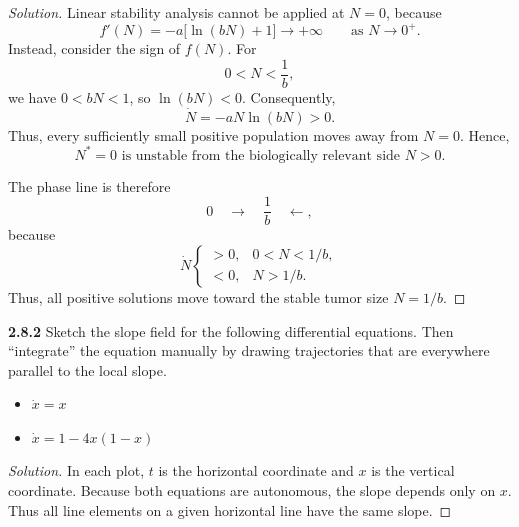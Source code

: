 \documentclass[10pt]{amsart}
\newenvironment{solution}
{\begin{proof}[Solution]}
{\end{proof}}
\begin{document}
\begin{onehalfspace}
\begin{solution}
            Linear stability analysis cannot be applied at \(N=0\), because
            \[
                f'(N)=-a\bigl[\ln(bN)+1\bigr]\longrightarrow+\infty
                \qquad\text{as }N\to0^+.
            \]
            Instead, consider the sign of \(f(N)\). For
            \[
                0<N<\frac{1}{b},
            \]
            we have \(0<bN<1\), so \(\ln(bN)<0\). Consequently,
            \[
                \dot{N}=-aN\ln(bN)>0.
            \]
            Thus, every sufficiently small positive population moves away from
            \(N=0\). Hence,
            \[
                \boxed{N^*=0\text{ is unstable from the biologically relevant side }
                N>0.}
            \]

            The phase line is therefore
            \[
                0\quad\longrightarrow\quad \frac{1}{b}
                \quad\longleftarrow,
            \]
            because
            \[
                \dot{N}
                \begin{cases}
                    >0, & 0<N<1/b,\\
                    <0, & N>1/b.
                \end{cases}
            \]
            Thus, all positive solutions move toward the stable tumor size
            \(N=1/b\).

        \end{solution}

        \noindent\textbf{2.8.2} Sketch the slope field for the following differential equations.
        Then ``integrate'' the equation manually by drawing trajectories that are everywhere
        parallel to the local slope.
        \begin{itemize}
            \item[(a)] $\dot{x} = x$
            \item[(c)] $\dot{x} = 1 - 4x(1 - x)$
        \end{itemize}

        \begin{solution}
            In each plot, $t$ is the horizontal coordinate and $x$ is the vertical
            coordinate. Because both equations are autonomous, the slope depends only
            on $x$. Thus all line elements on a given horizontal line have the same
            slope.


\end{solution}
\end{onehalfspace}
\end{document}
